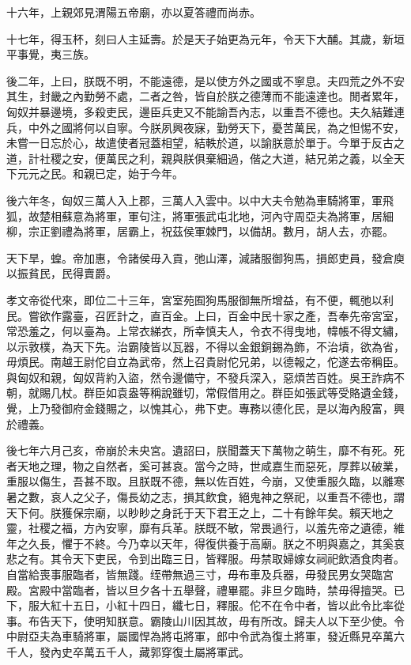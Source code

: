 十六年，上親郊見渭陽五帝廟，亦以夏答禮而尚赤。

十七年，得玉杯，刻曰人主延壽。於是天子始更為元年，令天下大酺。其歲，新垣平事覺，夷三族。

後二年，上曰，朕既不明，不能遠德，是以使方外之國或不寧息。夫四荒之外不安其生，封畿之內勤勞不處，二者之咎，皆自於朕之德薄而不能遠達也。閒者累年，匈奴并暴邊境，多殺吏民，邊臣兵吏又不能諭吾內志，以重吾不德也。夫久結難連兵，中外之國將何以自寧。今朕夙興夜寐，勤勞天下，憂苦萬民，為之怛惕不安，未嘗一日忘於心，故遣使者冠蓋相望，結軼於道，以諭朕意於單于。今單于反古之道，計社稷之安，便萬民之利，親與朕俱棄細過，偕之大道，結兄弟之義，以全天下元元之民。和親已定，始于今年。

後六年冬，匈奴三萬人入上郡，三萬人入雲中。以中大夫令勉為車騎將軍，軍飛狐，故楚相蘇意為將軍，軍句注，將軍張武屯北地，河內守周亞夫為將軍，居細柳，宗正劉禮為將軍，居霸上，祝茲侯軍棘門，以備胡。數月，胡人去，亦罷。

天下旱，蝗。帝加惠，令諸侯毋入貢，弛山澤，減諸服御狗馬，損郎吏員，發倉庾以振貧民，民得賣爵。

孝文帝從代來，即位二十三年，宮室苑囿狗馬服御無所增益，有不便，輒弛以利民。嘗欲作露臺，召匠計之，直百金。上曰，百金中民十家之產，吾奉先帝宮室，常恐羞之，何以臺為。上常衣綈衣，所幸慎夫人，令衣不得曳地，幃帳不得文繡，以示敦樸，為天下先。治霸陵皆以瓦器，不得以金銀銅錫為飾，不治墳，欲為省，毋煩民。南越王尉佗自立為武帝，然上召貴尉佗兄弟，以德報之，佗遂去帝稱臣。與匈奴和親，匈奴背約入盜，然令邊備守，不發兵深入，惡煩苦百姓。吳王詐病不朝，就賜几杖。群臣如袁盎等稱說雖切，常假借用之。群臣如張武等受賂遺金錢，覺，上乃發御府金錢賜之，以愧其心，弗下吏。專務以德化民，是以海內殷富，興於禮義。

後七年六月己亥，帝崩於未央宮。遺詔曰，朕聞蓋天下萬物之萌生，靡不有死。死者天地之理，物之自然者，奚可甚哀。當今之時，世咸嘉生而惡死，厚葬以破業，重服以傷生，吾甚不取。且朕既不德，無以佐百姓，今崩，又使重服久臨，以離寒暑之數，哀人之父子，傷長幼之志，損其飲食，絕鬼神之祭祀，以重吾不德也，謂天下何。朕獲保宗廟，以眇眇之身託于天下君王之上，二十有餘年矣。賴天地之靈，社稷之福，方內安寧，靡有兵革。朕既不敏，常畏過行，以羞先帝之遺德，維年之久長，懼于不終。今乃幸以天年，得復供養于高廟。朕之不明與嘉之，其奚哀悲之有。其令天下吏民，令到出臨三日，皆釋服。毋禁取婦嫁女祠祀飲酒食肉者。自當給喪事服臨者，皆無踐。绖帶無過三寸，毋布車及兵器，毋發民男女哭臨宮殿。宮殿中當臨者，皆以旦夕各十五舉聲，禮畢罷。非旦夕臨時，禁毋得擅哭。已下，服大紅十五日，小紅十四日，纖七日，釋服。佗不在令中者，皆以此令比率從事。布告天下，使明知朕意。霸陵山川因其故，毋有所改。歸夫人以下至少使。令中尉亞夫為車騎將軍，屬國悍為將屯將軍，郎中令武為復土將軍，發近縣見卒萬六千人，發內史卒萬五千人，藏郭穿復土屬將軍武。

